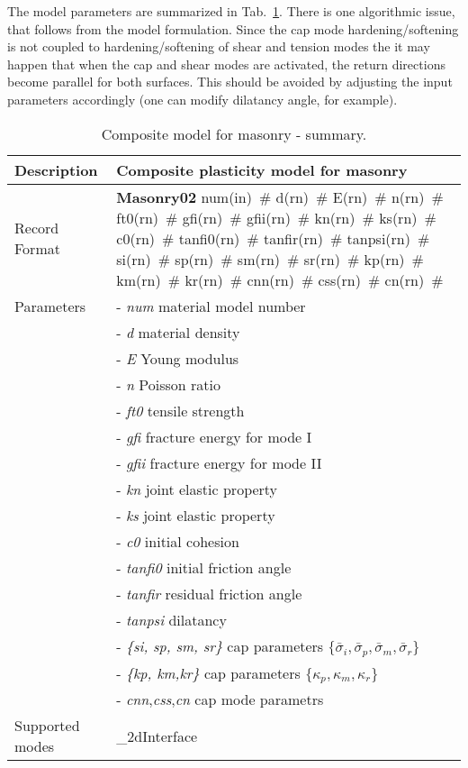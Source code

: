 \documentclass[a4paper]{article}
\newcommand{\descitem}[1]{{\noindent \bf #1}}
\newcommand{\elemparam}[2]{{{#1\tiny (#2)}~\#}}
\newcommand{\param}[1]{{\it #1}}
\newenvironment{mmt}{\begin{tabular}{|l|p{9cm}|}}{\end{tabular}\\}
\newenvironment{mmt}{\begin{tabular}{|l|l|}}{\end{tabular}\\}
\begin{document}
The model parameters are summarized in Tab.~\ref{compomasonry1_table}.
There is one algorithmic issue, that follows from the model
formulation. Since the cap mode hardening/softening is not coupled to
hardening/softening of shear and tension modes the it may happen that
when the cap and shear modes are activated, the return directions
become parallel for both surfaces. This should be avoided by adjusting
the input parameters accordingly (one can modify dilatancy angle, for example).

\begin{table}[!htb]
\begin{mmt}
\hline
Description & Composite plasticity model for masonry\\
\hline
Record Format & \descitem{Masonry02} \elemparam{num}{in} \elemparam{d}{rn} \elemparam{E}{rn}
\elemparam{n}{rn} \elemparam{ft0}{rn} \elemparam{gfi}{rn}
\elemparam{gfii}{rn}
\elemparam{kn}{rn} \elemparam{ks}{rn} \elemparam{c0}{rn}
\elemparam{tanfi0}{rn} \elemparam{tanfir}{rn} \elemparam{tanpsi}{rn}
\elemparam{si}{rn} \elemparam{sp}{rn} \elemparam{sm}{rn} \elemparam{sr}{rn}
\elemparam{kp}{rn} \elemparam{km}{rn} \elemparam{kr}{rn}
\elemparam{cnn}{rn} \elemparam{css}{rn} \elemparam{cn}{rn}\\
Parameters &- \param{num} material model number\\
&- \param{d} material density\\
&- \param{E} Young modulus\\
&- \param{n} Poisson ratio\\
&- \param{ft0} tensile strength\\
&- \param{gfi} fracture energy for mode I\\
&- \param{gfii} fracture energy for mode II\\
&- \param{kn} joint elastic property\\
&- \param{ks} joint elastic property\\
&- \param{c0} initial cohesion\\
&- \param{tanfi0} initial friction angle\\
&- \param{tanfir} residual friction angle\\
&- \param{tanpsi} dilatancy\\
&- \param{\{si, sp, sm, sr\}} cap parameters $\{\bar{\sigma}_i, \bar{\sigma}_p, \bar{\sigma}_m, \bar{\sigma}_r\}$\\
&- \param{\{kp, km,kr\}} cap parameters $\{\kappa_p, \kappa_m, \kappa_r\}$\\
&- \param{cnn},\param{css},\param{cn} cap mode parametrs\\
Supported modes& \_2dInterface\\
\hline
\end{mmt}
\caption{Composite model for masonry - summary.}
\label{compomasonry1_table}
\end{table}
\end{document}
